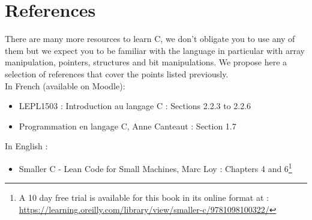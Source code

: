 \documentclass[a4paper,11pt]{article}
\begin{document}
\newpage
\section{References}
There are many more resources to learn C, we don't obligate you to use any of them but we expect you to be familiar with the language in particular with array manipulation, pointers, structures and bit manipulations. We propose here a selection of references that cover the points listed previously. \\

In French (available on Moodle):
\begin{itemize}
	\item LEPL1503 : Introduction au langage C : Sections 2.2.3 to 2.2.6
	\item Programmation en langage C, Anne Canteaut :  Section 1.7
\end{itemize}

In English :
\begin{itemize}
	\item Smaller C - Lean Code for Small Machines, Marc Loy : Chapters 4 and 6\footnote{A 10 day free trial is available for this book in its online format at : \url{https://learning.oreilly.com/library/view/smaller-c/9781098100322/}}
\end{itemize}
\end{document}
